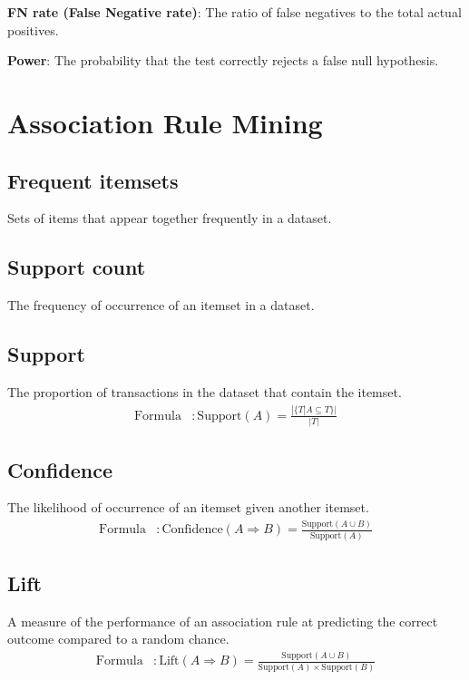 \documentclass{article}
\begin{document}
\textbf{FN rate (False Negative rate)}: The ratio of false negatives to the total actual positives.

\textbf{Power}: The probability that the test correctly rejects a false null hypothesis.

\section{Association Rule Mining}

\subsection{Frequent itemsets}
Sets of items that appear together frequently in a dataset.

\subsection{Support count}
The frequency of occurrence of an itemset in a dataset.

\subsection{Support}
The proportion of transactions in the dataset that contain the itemset.
\begin{align*}
    \text{Formula} &: \text{Support}(A) = \frac{| \{ T | A \subseteq T \} |}{| T |}
\end{align*}

\subsection{Confidence}
The likelihood of occurrence of an itemset given another itemset.
\begin{align*}
    \text{Formula} &: \text{Confidence}(A \Rightarrow B) = \frac{\text{Support}(A \cup B)}{\text{Support}(A)}
\end{align*}

\subsection{Lift}
A measure of the performance of an association rule at predicting the correct outcome compared to a random chance.
\begin{align*}
    \text{Formula} &: \text{Lift}(A \Rightarrow B) = \frac{\text{Support}(A \cup B)}{\text{Support}(A) \times \text{Support}(B)}
\end{align*}
\end{document}
